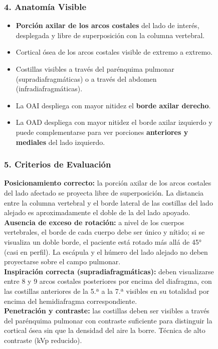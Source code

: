 \begin{figure}
{%
\subsubsection*{4. Anatomía Visible}

\begin{itemize}
  \item \textbf{Porción axilar de los arcos costales} del lado de interés, desplegada y libre de superposición con la columna vertebral.
  \item Cortical ósea de los arcos costales visible de extremo a extremo.
  \item Costillas visibles a través del parénquima pulmonar (supradiafragmáticas) o a través del abdomen (infradiafragmáticas).
  \item La OAI despliega con mayor nitidez el \textbf{borde axilar derecho}.
  \item La OAD despliega con mayor nitidez el borde axilar izquierdo y puede complementarse para ver porciones \textbf{anteriores y mediales} del lado izquierdo.
\end{itemize}

\subsubsection*{5. Criterios de Evaluación}

\textbf{Posicionamiento correcto:} la porción axilar de los arcos costales del lado afectado se proyecta libre de superposición. La distancia entre la columna vertebral y el borde lateral de las costillas del lado alejado es aproximadamente el doble de la del lado apoyado.\\

\textbf{Ausencia de exceso de rotación:} a nivel de los cuerpos vertebrales, el borde de cada cuerpo debe ser único y nítido; si se visualiza un doble borde, el paciente está rotado más allá de 45° (casi en perfil). La escápula y el húmero del lado alejado no deben proyectarse sobre el campo pulmonar.\\

\textbf{Inspiración correcta (supradiafragmáticas):} deben visualizarse entre 8 y 9 arcos costales posteriores por encima del diafragma, con las costillas anteriores de la 5.ª a la 7.ª visibles en su totalidad por encima del hemidiafragma correspondiente.\\

\textbf{Penetración y contraste:} las costillas deben ser visibles a través del parénquima pulmonar con contraste suficiente para distinguir la cortical ósea sin que la densidad del aire la borre. Técnica de alto contraste (kVp reducido).

}
\end{figure}
